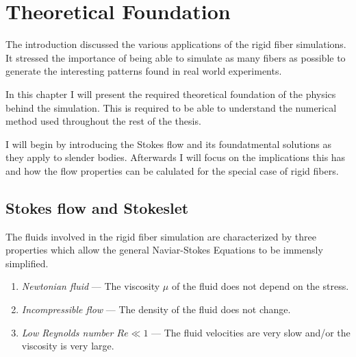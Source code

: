 \documentclass[a4paper,11pt]{kth-mag}
\begin{document}
%

\chapter{Theoretical Foundation}
\label{cha:theoretical_foundation}
The introduction discussed the various applications of the rigid fiber simulations. It stressed the importance of being able to simulate as many fibers as possible to generate the interesting patterns found in real world experiments.

In this chapter I will present the required theoretical foundation of the physics behind the simulation. This is required to be able to understand the numerical method used throughout the rest of the thesis.

I will begin by introducing the Stokes flow and its foundatmental solutions as they apply to slender bodies. Afterwards I will focus on the implications this has and how the flow properties can be calulated for the special case of rigid fibers.

\section{Stokes flow and Stokeslet}
The fluids involved in the rigid fiber simulation are characterized by three properties which allow the general Naviar-Stokes Equations to be immensly simplified.
\begin{enumerate}
  \item{\textit{Newtonian fluid} — The viscosity $\mu$ of the fluid does not depend on the stress.}
  \item{\textit{Incompressible flow} — The density of the fluid does not change.}
  \item{\textit{Low Reynolds number $Re \ll 1$} — The fluid velocities are very slow and/or the viscosity is very large.}
\end{enumerate}
\end{document}
